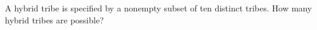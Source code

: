 A hybrid tribe is specified by a nonempty subset of ten distinct tribes. How many hybrid tribes are possible?
